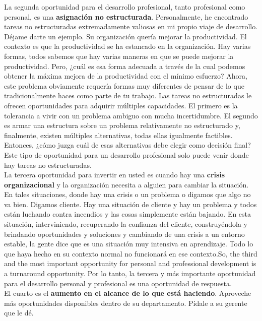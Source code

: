 \documentclass[10pt]{book}
\begin{document}
La segunda oportunidad para el desarrollo profesional, tanto profesional como personal, es una \textbf{asignación no estructurada}. Personalmente, he encontrado tareas no estructuradas extremadamente valiosas en mi propio viaje de desarrollo. Déjame darte un ejemplo. Su organización quería mejorar la productividad. El contexto es que la productividad se ha estancado en la organización. Hay varias formas, todos sabemos que hay varias maneras en que se puede mejorar la productividad. Pero, ¿cuál es esa forma adecuada a través de la cual podemos obtener la máxima mejora de la productividad con el mínimo esfuerzo? Ahora, este problema obviamente requería formas muy diferentes de pensar de lo que tradicionalmente haces como parte de tu trabajo. Las tareas no estructuradas le ofrecen oportunidades para adquirir múltiples capacidades. El primero es la tolerancia a vivir con un problema ambiguo con mucha incertidumbre. El segundo es armar una estructura sobre un problema relativamente no estructurado y, finalmente, existen múltiples alternativas, todas ellas igualmente factibles. Entonces, ¿cómo juzga cuál de esas alternativas debe elegir como decisión final? Este tipo de oportunidad para un desarrollo profesional solo puede venir donde hay tareas no estructuradas.\\
La tercera oportunidad para invertir en usted es cuando hay una \textbf{crisis organizacional} y la organización necesita a alguien para cambiar la situación. En tales situaciones, donde hay una crisis o un problema o digamos que algo no va bien. Digamos cliente. Hay una situación de cliente y hay un problema y todos están luchando contra incendios y las cosas simplemente están bajando. En esta situación, interviniendo, recuperando la confianza del cliente, construyéndola y brindando oportunidades y soluciones y cambiando de una crisis a un entorno estable, la gente dice que es una situación muy intensiva en aprendizaje. Todo lo que haya hecho en su contexto normal no funcionará en ese contexto.So, the third and the most important opportunity for personal and professional development is a turnaround opportunity. Por lo tanto, la tercera y más importante oportunidad para el desarrollo personal y profesional es una oportunidad de respuesta.\\
El cuarto es el \textbf{aumento en el alcance de lo que está haciendo}. Aproveche más oportunidades disponibles dentro de su departamento. Pídale a su gerente que le dé.
\end{document}
